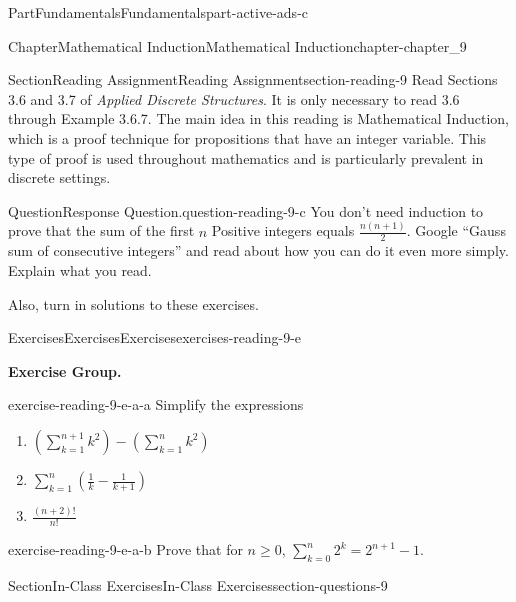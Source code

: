\documentclass[oneside,10pt,]{book}
\numberwithin{equation}{section}
\begin{document}
\begin{partptx}{Part}{Fundamentals}{}{Fundamentals}{}{}{part-active-ads-c}
\begin{chapterptx}{Chapter}{Mathematical Induction}{}{Mathematical Induction}{}{}{chapter-chapter_9}
\begin{sectionptx}{Section}{Reading Assignment}{}{Reading Assignment}{}{}{section-reading-9}
Read Sections 3.6 and 3.7 of \emph{Applied Discrete Structures}. It is only necessary to read 3.6 through Example 3.6.7.   The main idea in this reading is Mathematical Induction, which is a proof technique for propositions that have an integer variable.  This type of proof is used throughout mathematics and is particularly prevalent in discrete settings.%
\begin{question}{Question}{Response Question.}{question-reading-9-c}%
You don’t need induction to prove that the sum of the first \(n\) Positive integers equals \(\frac{n(n+1)}{2}\). Google “Gauss sum of consecutive integers” and read about how you can do it even more simply. Explain what you read.%
\end{question}
Also, turn in solutions to these exercises.%
%
%
\typeout{************************************************}
\typeout{************************************************}
%
\begin{exercises-subsection-numberless}{Exercises}{Exercises}{}{Exercises}{}{}{exercises-reading-9-e}
\par\medskip\noindent%
\textbf{Exercise Group.}\space\space%
\begin{exercisegroup}
\begin{divisionexerciseeg}{1}{}{}{exercise-reading-9-e-a-a}%
Simplify the expressions%
\begin{enumerate}[label=(\alph*)]
\item{}\(\displaystyle (\sum_{k=1}^{n+1}k^2) -(\sum_{k=1}^n k^2)\)%
\item{}\(\displaystyle \sum_{k=1}^n (\frac{1}{k}-\frac{1}{k+1})\)%
\item{}\(\displaystyle \frac{(n+2)!}{n!}\)%
\end{enumerate}
%
\end{divisionexerciseeg}%
\begin{divisionexerciseeg}{2}{}{}{exercise-reading-9-e-a-b}%
Prove that for \(n \ge 0\), \(\sum_{k=0}^n {2^k} = 2^{n+1}-1\).%
\end{divisionexerciseeg}%
\end{exercisegroup}
\par\medskip\noindent
\end{exercises-subsection-numberless}
\end{sectionptx}
%
%
\typeout{************************************************}
\typeout{************************************************}
%
\begin{sectionptx}{Section}{In-Class Exercises}{}{In-Class Exercises}{}{}{section-questions-9}

\end{sectionptx}
\end{chapterptx}
\end{partptx}
\end{document}
